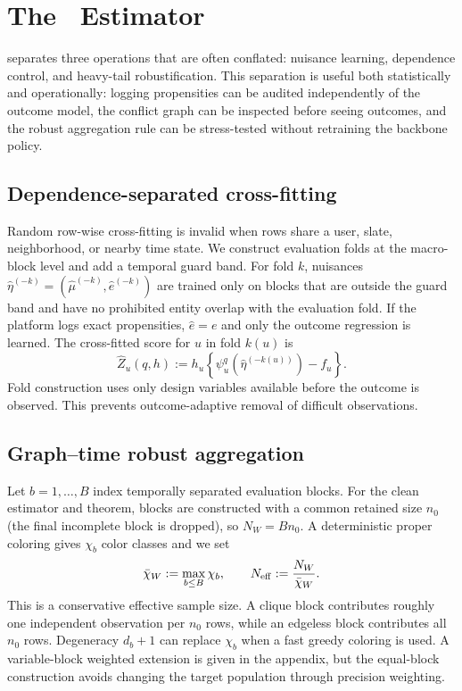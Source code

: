 \section{The \COMET\ Estimator}
\label{sec:method}

\COMET separates three operations that are often conflated: nuisance learning, dependence control, and heavy-tail robustification. This separation is useful both statistically and operationally: logging propensities can be audited independently of the outcome model, the conflict graph can be inspected before seeing outcomes, and the robust aggregation rule can be stress-tested without retraining the backbone policy.

\subsection{Dependence-separated cross-fitting}
Random row-wise cross-fitting is invalid when rows share a user, slate, neighborhood, or nearby time state. We construct evaluation folds at the macro-block level and add a temporal guard band. For fold $k$, nuisances $\widehat\eta^{(-k)}=(\widehat\mu^{(-k)},\widehat e^{(-k)})$ are trained only on blocks that are outside the guard band and have no prohibited entity overlap with the evaluation fold. If the platform logs exact propensities, $\widehat e=e$ and only the outcome regression is learned. The cross-fitted score for $u$ in fold $k(u)$ is
\begin{equation}
    \widehat Z_u(q,h)
    :=h_u\left\{\psi_u^q\!\left(\widehat\eta^{(-k(u))}\right)-f_u\right\}.
    \label{eq:crossfit-score}
\end{equation}
Fold construction uses only design variables available before the outcome is observed. This prevents outcome-adaptive removal of difficult observations.

\subsection{Graph--time robust aggregation}
Let $b=1,\ldots,B$ index temporally separated evaluation blocks. For the clean estimator and theorem, blocks are constructed with a common retained size $n_0$ (the final incomplete block is dropped), so $N_W=Bn_0$. A deterministic proper coloring gives $\chi_b$ color classes and we set
\begin{equation}
    \bar\chi_W:=\max_{b\le B}\chi_b,
    \qquad
    N_{\mathrm{eff}}:=\frac{N_W}{\bar\chi_W}.
    \label{eq:neff}
\end{equation}
This is a conservative effective sample size. A clique block contributes roughly one independent observation per $n_0$ rows, while an edgeless block contributes all $n_0$ rows. Degeneracy $d_b+1$ can replace $\chi_b$ when a fast greedy coloring is used. A variable-block weighted extension is given in the appendix, but the equal-block construction avoids changing the target population through precision weighting.

